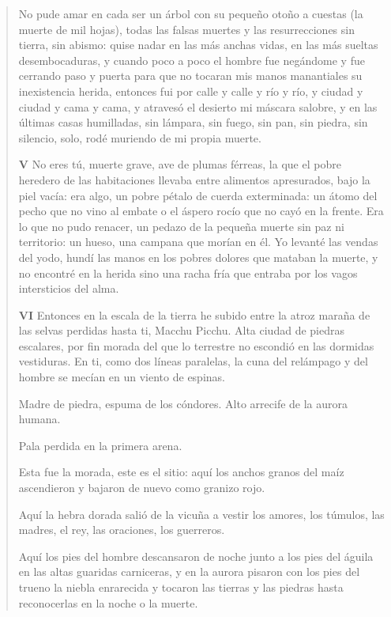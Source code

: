 \documentclass[12pt]{article}
\begin{document}
\begin{verse}
No pude amar en cada ser un árbol  
con su pequeño otoño a cuestas (la muerte de mil hojas),  
todas las falsas muertes y las resurrecciones  
sin tierra, sin abismo:  
quise nadar en las más anchas vidas,  
en las más sueltas desembocaduras,  
y cuando poco a poco el hombre fue negándome  
y fue cerrando paso y puerta para que no tocaran  
mis manos manantiales su inexistencia herida,  
entonces fui por calle y calle y río y río,  
y ciudad y ciudad y cama y cama,  
y atravesó el desierto mi máscara salobre,  
y en las últimas casas humilladas, sin lámpara, sin fuego,  
sin pan, sin piedra, sin silencio, solo,  
rodé muriendo de mi propia muerte.  

\textbf{ V}
No eres tú, muerte grave, ave de plumas férreas,  
la que el pobre heredero de las habitaciones  
llevaba entre alimentos apresurados, bajo la piel vacía:  
era algo, un pobre pétalo de cuerda exterminada:  
un átomo del pecho que no vino al embate  
o el áspero rocío que no cayó en la frente.  
Era lo que no pudo renacer, un pedazo  
de la pequeña muerte sin paz ni territorio:  
un hueso, una campana que morían en él.  
Yo levanté las vendas del yodo, hundí las manos  
en los pobres dolores que mataban la muerte,  
y no encontré en la herida sino una racha fría  
que entraba por los vagos intersticios del alma.  

\textbf{ VI}
Entonces en la escala de la tierra he subido  
entre la atroz maraña de las selvas perdidas  
hasta ti, Macchu Picchu.  
Alta ciudad de piedras escalares,  
por fin morada del que lo terrestre  
no escondió en las dormidas vestiduras.  
En ti, como dos líneas paralelas,  
la cuna del relámpago y del hombre  
se mecían en un viento de espinas.  
	
Madre de piedra, espuma de los cóndores.  
Alto arrecife de la aurora humana.  
	
Pala perdida en la primera arena.  
	
Esta fue la morada, este es el sitio:  
aquí los anchos granos del maíz ascendieron  
y bajaron de nuevo como granizo rojo.  
	
Aquí la hebra dorada salió de la vicuña  
a vestir los amores, los túmulos, las madres,  
el rey, las oraciones, los guerreros.  
	
Aquí los pies del hombre descansaron de noche  
junto a los pies del águila en las altas guaridas  
carniceras, y en la aurora  
pisaron con los pies del trueno la niebla enrarecida  
y tocaron las tierras y las piedras  
hasta reconocerlas en la noche o la muerte.  
	

\end{verse}
\end{document}
